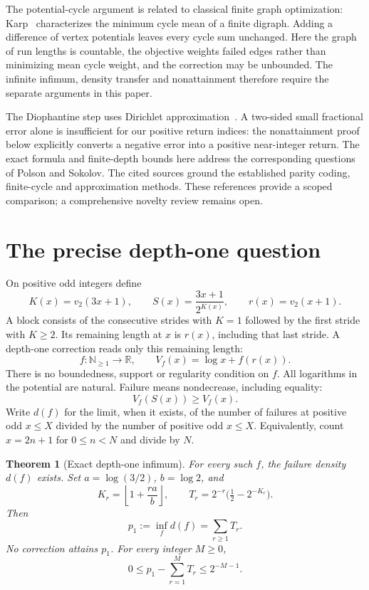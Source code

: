 \documentclass[11pt,letterpaper]{article}
\newtheorem{theorem}{Theorem}
\newcommand{\NN}{\mathbb{N}}
\newcommand{\RR}{\mathbb{R}}
\begin{document}
The potential-cycle argument is related to classical finite graph
optimization: Karp~\cite{karp} characterizes the minimum cycle mean of a
finite digraph. Adding a difference of vertex potentials leaves every cycle
sum unchanged. Here the graph of run lengths is countable, the objective
weights failed edges rather than minimizing mean cycle weight, and the
correction may be unbounded. The infinite infimum, density transfer and
nonattainment therefore require the separate arguments in this paper.

The Diophantine step uses Dirichlet approximation~\cite{dirichlet}.
A two-sided small fractional error alone is insufficient for our positive
return indices: the nonattainment proof below explicitly converts a negative
error into a positive near-integer return. The exact formula and finite-depth bounds here address
the corresponding questions of Polson and Sokolov. The cited sources ground
the established parity coding, finite-cycle and approximation methods.
These references provide a scoped comparison; a comprehensive novelty review
remains open.

\section{The precise depth-one question}
On positive odd integers define
\[
 K(x)=v_2(3x+1),\qquad S(x)=\frac{3x+1}{2^{K(x)}},\qquad r(x)=v_2(x+1).
\]
A block consists of the consecutive strides with $K=1$ followed by the first
stride with $K\ge2$. Its remaining length at $x$ is $r(x)$, including that
last stride. A depth-one correction reads only this remaining length:
\[
 f:\NN_{\ge1}\longrightarrow\RR,\qquad
 V_f(x)=\log x+f(r(x)).
\]
There is no boundedness, support or regularity condition on $f$. All logarithms
in the potential are natural. Failure means nondecrease, including equality:
\[
 V_f(S(x))\ge V_f(x).
\]
Write $d(f)$ for the limit, when it exists, of the number of failures at
positive odd $x\le X$ divided by the number of positive odd $x\le X$.
Equivalently, count $x=2n+1$ for $0\le n<N$ and divide by $N$.

\begin{theorem}[Exact depth-one infimum]\label{thm:depth-one}
For every such $f$, the failure density $d(f)$ exists. Set
$a=\log(3/2)$, $b=\log2$, and
\[
 K_r=\left\lfloor1+\frac{ra}{b}\right\rfloor,\qquad
 T_r=2^{-r}\bigl(\tfrac12-2^{-K_r}\bigr).
\]
Then
\begin{equation}\label{eq:infimum}
 p_1:=\inf_f d(f)=\sum_{r\ge1}T_r.
\end{equation}
No correction attains $p_1$. For every integer $M\ge0$,
\begin{equation}\label{eq:tail}
 0\le p_1-\sum_{r=1}^{M}T_r\le2^{-M-1}.
\end{equation}
\end{theorem}
\end{document}
